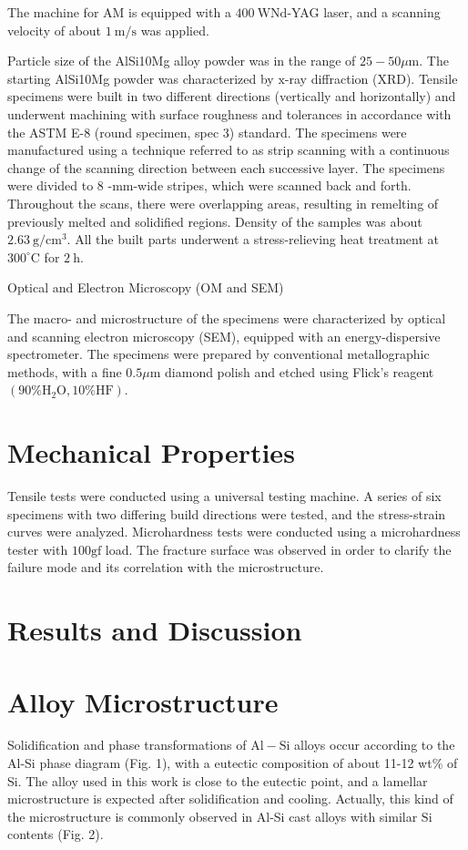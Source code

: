 \documentclass[10pt]{article}
\begin{document}
The machine for $\mathrm{AM}$ is equipped with a $400 \mathrm{~W} \mathrm{Nd}$-YAG laser, and a scanning velocity of about $1 \mathrm{~m} / \mathrm{s}$ was applied.

Particle size of the AlSi10Mg alloy powder was in the range of $25-50 \mu \mathrm{m}$. The starting AlSi10Mg powder was characterized by $\mathrm{x}$-ray diffraction (XRD). Tensile specimens were built in two different directions (vertically and horizontally) and underwent machining with surface roughness and tolerances in accordance with the ASTM E-8 (round specimen, spec 3) standard. The specimens were manufactured using a technique referred to as strip scanning with a continuous change of the scanning direction between each successive layer. The specimens were divided to 8 -mm-wide stripes, which were scanned back and forth. Throughout the scans, there were overlapping areas, resulting in remelting of previously melted and solidified regions. Density of the samples was about $2.63 \mathrm{~g} / \mathrm{cm}^{3}$. All the built parts underwent a stress-relieving heat treatment at $300^{\circ} \mathrm{C}$ for $2 \mathrm{~h}$.

Optical and Electron Microscopy (OM and SEM)

The macro- and microstructure of the specimens were characterized by optical and scanning electron microscopy (SEM), equipped with an energy-dispersive spectrometer. The specimens were prepared by conventional metallographic methods, with a fine $0.5 \mu \mathrm{m}$ diamond polish and etched using Flick's reagent $\left(90 \% \mathrm{H}_{2} \mathrm{O}, 10 \% \mathrm{HF}\right)$.

\section*{Mechanical Properties}
Tensile tests were conducted using a universal testing machine. A series of six specimens with two differing build directions were tested, and the stress-strain curves were analyzed. Microhardness tests were conducted using a microhardness tester with $100 \mathrm{gf}$ load. The fracture surface was observed in order to clarify the failure mode and its correlation with the microstructure.

\section*{Results and Discussion}
\section*{Alloy Microstructure}
Solidification and phase transformations of $\mathrm{Al}-\mathrm{Si}$ alloys occur according to the Al-Si phase diagram (Fig. 1), with a eutectic composition of about 11-12 wt\% of Si. The alloy used in this work is close to the eutectic point, and a lamellar microstructure is expected after solidification and cooling. Actually, this kind of the microstructure is commonly observed in Al-Si cast alloys with similar $\mathrm{Si}$ contents (Fig. 2).
\end{document}
